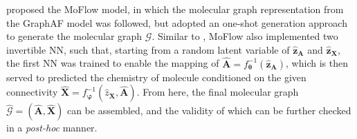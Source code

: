 \citet{zang2020moflow} proposed the MoFlow model, in which the molecular graph representation from the GraphAF\cite{shi2020graphaf} model was followed, but adopted an one-shot generation approach to generate the molecular graph $\mathcal{G}$. Similar to \citet{madhawa2019graphnvp}, MoFlow also implemented two invertible NN, such that, starting from a random latent variable of $\hat{\bm{z}}_{\bm{A}}$ and $\hat{\bm{z}}_{\bm{X}}$, the first NN was trained to enable the mapping of $\hat{\bm{A}}=f_{\boldsymbol{\theta}}^{-1}(\hat{\bm{z}}_{\bm{A}})$, which is then served to predicted the chemistry of molecule conditioned on the given connectivity $\bm{\hat{X}}=f_{\boldsymbol{\varphi}}^{-1}(\hat{z}_{\bm{X}},\hat{\bm{A}})$. From here, the final molecular graph $\hat{\mathcal{G}}=(\hat{\bm{A}},\hat{\bm{X}})$ can be assembled, and the validity of which can be further checked in a \emph{post-hoc} manner.

